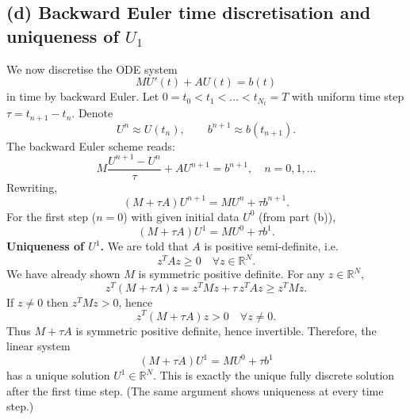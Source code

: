 \subsection*{(d) Backward Euler time discretisation and uniqueness of $U_1$}
We now discretise the ODE system
\[
    M U'(t) + A U(t) = b(t)
\]
in time by backward Euler.
Let $0=t_0<t_1<\dots<t_{N_t}=T$ with uniform time step $\tau = t_{n+1}-t_n$. Denote
\[
    U^n \approx U(t_n),\qquad b^{n+1} \approx b(t_{n+1}).
\]
The backward Euler scheme reads:
\[
    M \frac{U^{n+1}-U^n}{\tau} + A U^{n+1} = b^{n+1},\quad n=0,1,\dots
\]
Rewriting,
\[
    (M + \tau A) U^{n+1} = M U^n + \tau b^{n+1}.
\]
For the first step ($n=0$) with given initial data $U^0$ (from part (b)),
\[
    \boxed{(M + \tau A) U^1 = M U^0 + \tau b^{1}.}
\]
\textbf{Uniqueness of $U^1$.}
We are told that $A$ is positive semi-definite, i.e.
\[
    z^T A z \ge 0 \quad \forall z\in\mathbb{R}^N.
\]
We have already shown $M$ is symmetric positive definite. For any $z\in\mathbb{R}^N$,
\[
    z^T (M + \tau A) z
    = z^T M z + \tau\, z^T A z
    \ge z^T M z.
\]
If $z\neq 0$ then $z^T M z > 0$, hence
\[
    z^T (M + \tau A) z > 0 \quad \forall z\neq 0.
\]
Thus $M+\tau A$ is symmetric positive definite, hence invertible.
Therefore, the linear system
\[
    (M + \tau A) U^1 = M U^0 + \tau b^{1}
\]
has a unique solution $U^1\in\mathbb{R}^N$. This is exactly the unique fully discrete solution
after the first time step. (The same argument shows uniqueness at every time step.)

